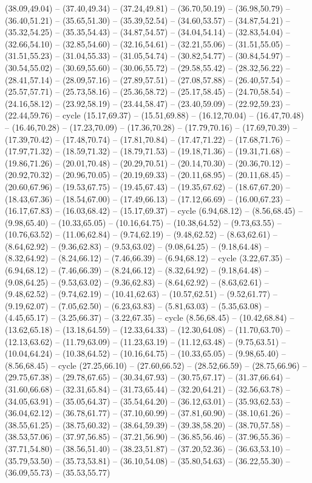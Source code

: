 {(38.09,49.04) -- (37.40,49.34) -- (37.24,49.81) -- (36.70,50.19) -- (36.98,50.79) -- (36.40,51.21) -- (35.65,51.30) -- (35.39,52.54) -- (34.60,53.57) -- (34.87,54.21) -- (35.32,54.25) -- (35.35,54.43) -- (34.87,54.57) -- (34.04,54.14) -- (32.83,54.04) -- (32.66,54.10) -- (32.85,54.60) -- (32.16,54.61) -- (32.21,55.06) -- (31.51,55.05) -- (31.51,55.23) -- (31.04,55.33) -- (31.05,54.74) -- (30.82,54.77) -- (30.84,54.97) -- (30.54,55.02) -- (30.69,55.60) -- (30.06,55.72) -- (29.58,55.42) -- (28.32,56.22) -- (28.41,57.14) -- (28.09,57.16) -- (27.89,57.51) -- (27.08,57.88) -- (26.40,57.54) -- (25.57,57.71) -- (25.73,58.16) -- (25.36,58.72) -- (25.17,58.45) -- (24.70,58.54) -- (24.16,58.12) -- (23.92,58.19) -- (23.44,58.47) -- (23.40,59.09) -- (22.92,59.23) -- (22.44,59.76) -- cycle (15.17,69.37) -- (15.51,69.88) -- (16.12,70.04) -- (16.47,70.48) -- (16.46,70.28) -- (17.23,70.09) -- (17.36,70.28) -- (17.79,70.16) -- (17.69,70.39) -- (17.39,70.42) -- (17.48,70.74) -- (17.81,70.84) -- (17.47,71.22) -- (17.68,71.76) -- (17.97,71.32) -- (18.59,71.32) -- (18.79,71.53) -- (19.18,71.36) -- (19.31,71.68) -- (19.86,71.26) -- (20.01,70.48) -- (20.29,70.51) -- (20.14,70.30) -- (20.36,70.12) -- (20.92,70.32) -- (20.96,70.05) -- (20.19,69.33) -- (20.11,68.95) -- (20.11,68.45) -- (20.60,67.96) -- (19.53,67.75) -- (19.45,67.43) -- (19.35,67.62) -- (18.67,67.20) -- (18.43,67.36) -- (18.54,67.00) -- (17.49,66.13) -- (17.12,66.69) -- (16.00,67.23) -- (16.17,67.83) -- (16.03,68.42) -- (15.17,69.37) -- cycle (6.94,68.12) -- (8.56,68.45) -- (9.98,65.40) -- (10.33,65.05) -- (10.16,64.75) -- (10.38,64.52) -- (9.73,63.55) -- (10.76,63.52) -- (11.06,62.84) -- (9.74,62.19) -- (9.48,62.52) -- (8.63,62.61) -- (8.64,62.92) -- (9.36,62.83) -- (9.53,63.02) -- (9.08,64.25) -- (9.18,64.48) -- (8.32,64.92) -- (8.24,66.12) -- (7.46,66.39) -- (6.94,68.12) -- cycle (3.22,67.35) -- (6.94,68.12) -- (7.46,66.39) -- (8.24,66.12) -- (8.32,64.92) -- (9.18,64.48) -- (9.08,64.25) -- (9.53,63.02) -- (9.36,62.83) -- (8.64,62.92) -- (8.63,62.61) -- (9.48,62.52) -- (9.74,62.19) -- (10.41,62.63) -- (10.57,62.51) -- (9.52,61.77) -- (9.19,62.07) -- (7.05,62.50) -- (6.23,63.83) -- (5.81,63.03) -- (5.35,63.08) -- (4.45,65.17) -- (3.25,66.37) -- (3.22,67.35) -- cycle (8.56,68.45) -- (10.42,68.84) -- (13.62,65.18) -- (13.18,64.59) -- (12.33,64.33) -- (12.30,64.08) -- (11.70,63.70) -- (12.13,63.62) -- (11.79,63.09) -- (11.23,63.19) -- (11.12,63.48) -- (9.75,63.51) -- (10.04,64.24) -- (10.38,64.52) -- (10.16,64.75) -- (10.33,65.05) -- (9.98,65.40) -- (8.56,68.45) -- cycle (27.25,66.10) -- (27.60,66.52) -- (28.52,66.59) -- (28.75,66.96) -- (29.75,67.38) -- (29.78,67.65) -- (30.34,67.93) -- (30.75,67.17) -- (31.37,66.64) -- (31.60,66.68) -- (32.31,65.84) -- (31.73,65.44) -- (32.20,64.21) -- (32.56,63.78) -- (34.05,63.91) -- (35.05,64.37) -- (35.54,64.20) -- (36.12,63.01) -- (35.93,62.53) -- (36.04,62.12) -- (36.78,61.77) -- (37.10,60.99) -- (37.81,60.90) -- (38.10,61.26) -- (38.55,61.25) -- (38.75,60.32) -- (38.64,59.39) -- (39.38,58.20) -- (38.70,57.58) -- (38.53,57.06) -- (37.97,56.85) -- (37.21,56.90) -- (36.85,56.46) -- (37.96,55.36) -- (37.71,54.80) -- (38.56,51.40) -- (38.23,51.87) -- (37.20,52.36) -- (36.63,53.10) -- (35.79,53.50) -- (35.73,53.81) -- (36.10,54.08) -- (35.80,54.63) -- (36.22,55.30) -- (36.09,55.73) -- (35.53,55.77) }
